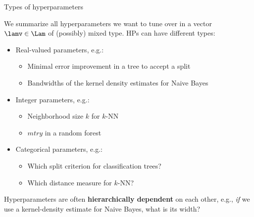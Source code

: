 \begin{vbframe}{Types of hyperparameters}

We summarize all hyperparameters we want to tune over in a vector $\lamv \in \Lam$ of (possibly) mixed type. HPs can have different types: 

\begin{itemize}
\item Real-valued parameters, e.g.:
\begin{itemize}
\item Minimal error improvement in a tree to accept a split
\item Bandwidths of the kernel density estimates for Naive Bayes 
\end{itemize}
\item Integer parameters, e.g.:
\begin{itemize}
\item Neighborhood size $k$ for $k$-NN
\item $mtry$ in a random forest
\end{itemize}
\item Categorical parameters, e.g.:
\begin{itemize}
\item Which split criterion for classification trees?
\item Which distance measure for $k$-NN?
\end{itemize}
\end{itemize}

Hyperparameters are often \textbf{hierarchically dependent} on each other, e.g., \emph{if} we use 
a kernel-density estimate for Naive Bayes, what is its width? 
\end{vbframe}


\endlecture


